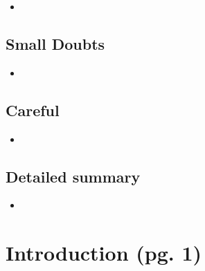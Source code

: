 \documentclass{article}
\begin{document}
    \begin{itemize}

    \item 
    
    \end{itemize}

\subsection{Small Doubts}

    \begin{itemize}

    \item 
    
    \end{itemize}

\subsection{Careful}

    \begin{itemize}

    \item 
    
    \end{itemize}

\subsection{Detailed summary}

    \begin{itemize}

    \item 
    
    \end{itemize}

\section{Introduction (pg. 1)}

\end{document}

